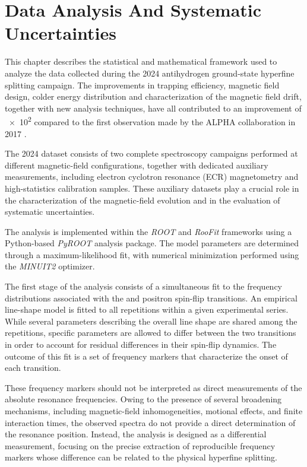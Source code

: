 \chapter{Data Analysis And Systematic Uncertainties}
\label{ch:analysis}

This chapter describes the statistical and mathematical framework used to analyze the data collected during the 2024 antihydrogen ground-state hyperfine splitting campaign. The improvements in trapping efficiency, magnetic field design, colder energy distribution and characterization of the magnetic field drift, together with new analysis techniques, have all contributed to an improvement of \num{e2} compared to the first observation made by the ALPHA collaboration in 2017 \cite{ALPHA:2017fsh}.

The 2024 dataset consists of two complete spectroscopy campaigns performed at different magnetic-field configurations, together with dedicated auxiliary measurements, including electron cyclotron resonance (ECR) magnetometry and high-statistics calibration samples. These auxiliary datasets play a crucial role in the characterization of the magnetic-field evolution and in the evaluation of systematic uncertainties.

The analysis is implemented within the \textit{ROOT} and \textit{RooFit} frameworks using a Python-based \textit{PyROOT} analysis package. The model parameters are determined through a maximum-likelihood fit, with numerical minimization performed using the \textit{MINUIT2} optimizer.

The first stage of the analysis consists of a simultaneous fit to the frequency distributions associated with the \cb and \da positron spin-flip transitions. An empirical line-shape model is fitted to all repetitions within a given experimental series. While several parameters describing the overall line shape are shared among the repetitions, specific parameters are allowed to differ between the two transitions in order to account for residual differences in their spin-flip dynamics. The outcome of this fit is a set of frequency markers that characterize the onset of each transition.

These frequency markers should not be interpreted as direct measurements of the absolute resonance frequencies. Owing to the presence of several broadening mechanisms, including magnetic-field inhomogeneities, motional effects, and finite interaction times, the observed spectra do not provide a direct determination of the resonance position. Instead, the analysis is designed as a differential measurement, focusing on the precise extraction of reproducible frequency markers whose difference can be related to the physical hyperfine splitting.


